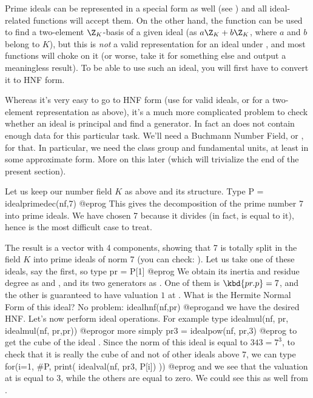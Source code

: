 Prime ideals can be represented in a special form as well (see
) and all ideal-related functions will accept them. On the
other hand, the function  can be used to find a two-element
$\Z_K$-basis of a given ideal (as $a\Z_K + b\Z_K$, where $a$ and $b$ belong
to $K$), but this is \emph{not} a valid representation for an ideal under
, and most functions will choke on it (or worse, take it for
something else and output a meaningless result). To be able to use such an
ideal, you will first have to convert it to HNF form.

Whereas it's very easy to go to HNF form (use  for valid
ideals, or  for a two-element representation as above),
it's a much more complicated problem to check whether an ideal is principal
and find a generator. In fact an  does not contain enough data for
this particular task. We'll need a Buchmann Number Field, or , for
that. In particular, we need the class group and fundamental units, at least
in some approximate form. More on this later (which will trivialize the end
of the present section).\smallskip

Let us keep our number field $K$ as above and its  structure. Type
\bprog
  P = idealprimedec(nf,7)
@eprog\noindent
This gives the decomposition of the prime number 7 into prime ideals. We have
chosen 7 because it divides  (in fact, is equal to it), hence
is the most difficult case to treat.

The result is a vector with 4 components, showing that 7 is totally split in
the field $K$ into prime ideals of norm 7 (you can check:
). Let us take one of these ideals, say the first, so
type
\bprog
  pr = P[1]
@eprog
We obtain its inertia and residue degree as 
and , and its two generators as . One of them is
$\kbd{pr.p} = 7$, and the other is guaranteed to have valuation $1$ at
. What is the Hermite Normal Form of this ideal? No problem:
\bprog
  idealhnf(nf,pr)
@eprog\noindent and we have the desired HNF. Let's now perform ideal
operations. For example type
\bprog
  idealmul(nf, pr, idealmul(nf, pr,pr))
@eprog\noindent or more simply
\bprog
  pr3 = idealpow(nf, pr,3)
@eprog\noindent
to get the cube of the ideal . Since the norm of this ideal is equal
to $343=7^3$, to check that it is really the cube of  and not of
other ideals above 7, we can type
\bprog
  for(i=1, #P, print( idealval(nf, pr3, P[i]) ))
@eprog\noindent
and we see that the valuation at  is equal to 3, while the others are
equal to zero. We could see this as well from .

